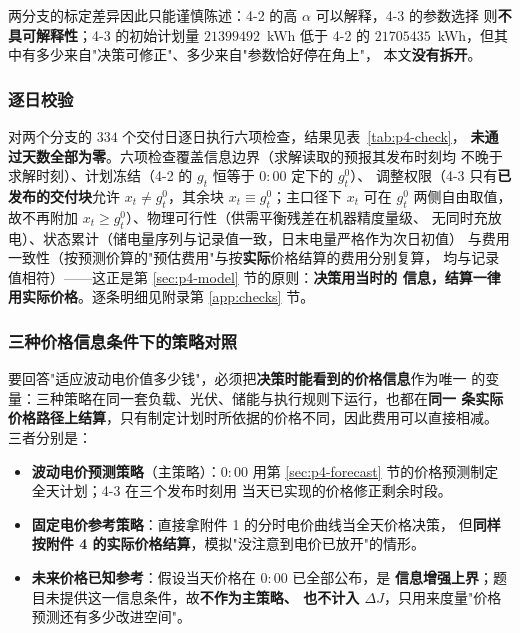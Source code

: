 两分支的标定差异因此只能谨慎陈述：4-2 的高 $\alpha$ 可以解释，4-3 的参数选择
则\textbf{不具可解释性}；4-3 的初始计划量 $21399492$~kWh 低于 4-2 的
$21705435$~kWh，但其中有多少来自"决策可修正"、多少来自"参数恰好停在角上"，
本文\textbf{没有拆开}。

\subsubsection{逐日校验}

对两个分支的 $334$ 个交付日逐日执行六项检查，结果见表~\ref{tab:p4-check}，
\textbf{未通过天数全部为零}。六项检查覆盖信息边界（求解读取的预报其发布时刻均
不晚于求解时刻）、计划冻结（4-2 的 $g_t$ 恒等于 $0{:}00$ 定下的 $g_t^0$）、
调整权限（4-3 只有\textbf{已发布的交付块}允许 $x_t\neq g_t^0$，其余块
$x_t\equiv g_t^0$；主口径下 $x_t$ 可在 $g_t^0$ 两侧自由取值，故不再附加
$x_t\ge g_t^0$）、物理可行性（供需平衡残差在机器精度量级、
无同时充放电）、状态累计（储电量序列与记录值一致，日末电量严格作为次日初值）
与费用一致性（按预测价算的"预估费用"与按\textbf{实际}价格结算的费用分别复算，
均与记录值相符）——这正是第 \ref{sec:p4-model} 节的原则：\textbf{决策用当时的
信息，结算一律用实际价格}。逐条明细见附录第 \ref{app:checks} 节。

\subsubsection{三种价格信息条件下的策略对照}
\label{sec:p4-strategy}

要回答"适应波动电价值多少钱"，必须把\textbf{决策时能看到的价格信息}作为唯一
的变量：三种策略在同一套负载、光伏、储能与执行规则下运行，也都在\textbf{同一
条实际价格路径上结算}，只有制定计划时所依据的价格不同，因此费用可以直接相减。
三者分别是：

\begin{itemize}
  \item \textbf{波动电价预测策略}（主策略）：$0{:}00$ 用第
        \ref{sec:p4-forecast} 节的价格预测制定全天计划；4-3 在三个发布时刻用
        当天已实现的价格修正剩余时段。
  \item \textbf{固定电价参考策略}：直接拿附件 1 的分时电价曲线当全天价格决策，
        但\textbf{同样按附件 4 的实际价格结算}，模拟"没注意到电价已放开"的情形。
  \item \textbf{未来价格已知参考}：假设当天价格在 $0{:}00$ 已全部公布，是
        \textbf{信息增强上界}；题目未提供这一信息条件，故\textbf{不作为主策略、
        也不计入 $\Delta J$}，只用来度量"价格预测还有多少改进空间"。
\end{itemize}

